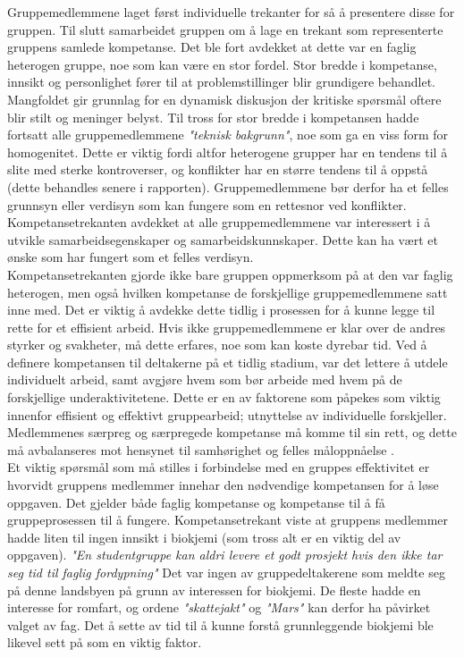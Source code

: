 Gruppemedlemmene laget først individuelle trekanter for så å presentere disse for gruppen.
Til slutt samarbeidet gruppen om å lage en trekant som representerte gruppens samlede kompetanse.
Det ble fort avdekket at dette var en faglig heterogen gruppe, noe som kan være en stor fordel.
Stor bredde i kompetanse, innsikt og personlighet fører til at problemstillinger blir grundigere behandlet.
Mangfoldet gir grunnlag for en dynamisk diskusjon der kritiske spørsmål oftere blir stilt og meninger belyst.
Til tross for stor bredde i kompetansen hadde fortsatt alle gruppemedlemmene \emph{"teknisk bakgrunn"}, noe som ga en viss form for homogenitet.
Dette er viktig fordi altfor heterogene grupper har en tendens til å slite med sterke kontroverser, og konflikter har en større tendens til å oppstå (dette behandles senere i rapporten).
Gruppemedlemmene bør derfor ha et felles grunnsyn eller verdisyn som kan fungere som en rettesnor ved konflikter.
Kompetansetrekanten avdekket at alle gruppemedlemmene var interessert i å utvikle samarbeidsegenskaper og samarbeidskunnskaper.
Dette kan ha vært et ønske som har fungert som et felles verdisyn.\\

Kompetansetrekanten gjorde ikke bare gruppen oppmerksom på at den var faglig heterogen, men også hvilken kompetanse de forskjellige gruppemedlemmene satt inne med.
Det er viktig å avdekke dette tidlig i prosessen for å kunne legge til rette for et effisient arbeid.
Hvis ikke gruppemedlemmene er klar over de andres styrker og svakheter, må dette erfares, noe som kan koste dyrebar tid.
Ved å definere kompetansen til deltakerne på et tidlig stadium, var det lettere å utdele individuelt arbeid, samt avgjøre hvem som bør arbeide med hvem på de forskjellige underaktivitetene.
Dette er en av faktorene som påpekes som viktig innenfor effisient og effektivt gruppearbeid; utnyttelse av individuelle forskjeller.
Medlemmenes særpreg og særpregede kompetanse må komme til sin rett, og dette må avbalanseres mot hensynet til samhørighet og felles måloppnåelse \cite{orgorg}.\\

Et viktig spørsmål som må stilles i forbindelse med en gruppes effektivitet er hvorvidt gruppens medlemmer innehar den nødvendige kompetansen for å løse oppgaven.
Det gjelder både faglig kompetanse og kompetanse til å få gruppeprosessen til å fungere.
Kompetansetrekant viste at gruppens medlemmer hadde liten til ingen innsikt i biokjemi (som tross alt er en viktig del av oppgaven).
\textit{"En studentgruppe kan aldri levere et godt prosjekt hvis den ikke tar seg tid til faglig fordypning"} \cite{orgorg}
Det var ingen av gruppedeltakerene som meldte seg på denne landsbyen på grunn av interessen for biokjemi.
De fleste hadde en interesse for romfart, og ordene \emph{"skattejakt"} og \emph{"Mars"} kan derfor ha påvirket valget av fag.
Det å sette av tid til å kunne forstå grunnleggende biokjemi ble likevel sett på som en viktig faktor.\\

